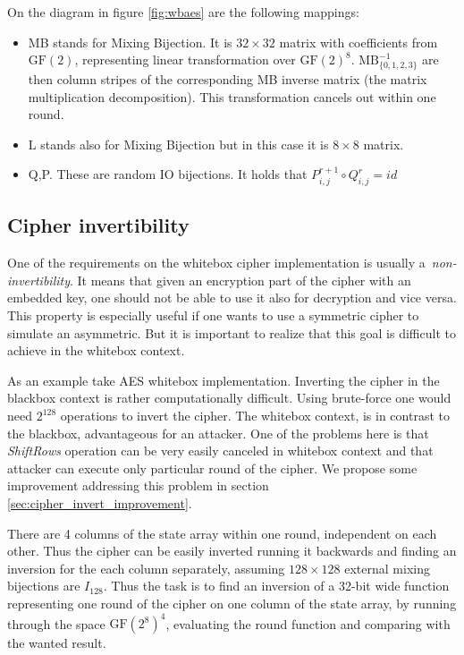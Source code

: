 \documentclass[11pt,oneside,final]{fithesis2}
\newcommand{\gf}{\ensuremath{\text{GF}\left(2\right)}}
\begin{document}
    On the diagram in figure \ref{fig:wbaes} are the following mappings:
    \begin{itemize}
    \item MB stands for Mixing Bijection. It is $32 \times 32$ matrix with coefficients from $\text{GF}(2)$, representing linear transformation over $\gf^8$. 
    $\text{MB}^{-1}_{\{0,1,2,3\}}$ are then column stripes of the corresponding MB inverse matrix (the matrix multiplication decomposition).
    This transformation cancels out within one round. 
    \item L stands also for Mixing Bijection but in this case it is $8 \times 8$ matrix.
    \item Q,P. These are random IO bijections. It holds that $P^{r+1}_{i,j} \circ Q^{r}_{i,j} = id$
    \end{itemize}

    \subsection{Cipher invertibility}\label{sec:cipher_invertibility}
    One of the requirements on the whitebox cipher implementation is usually a~\emph{non-invertibility}. It means that given an encryption part of the cipher 
    with an embedded key, one should not be able to use it also for decryption and vice versa. This property is especially useful if one wants to use a symmetric
    cipher to simulate an asymmetric. But it is important to realize that this goal is difficult to achieve in the whitebox context.
    
    As an example take AES whitebox implementation.
    Inverting the cipher in the blackbox context is rather computationally difficult. Using brute-force one would
    need $2^{128}$ operations to invert the cipher. The whitebox context, is in contrast to the blackbox, advantageous for an attacker. One of the problems here is 
    that \emph{ShiftRows} operation can be very easily canceled in whitebox context and that attacker can execute only particular round of the cipher. 
    We propose some improvement addressing this problem in section \ref{sec:cipher_invert_improvement}.

    There are 4 columns of the state array within one round, independent on each other.
    Thus the cipher can be easily inverted running it backwards and finding an inversion for the each column separately, assuming $128\times128$ external mixing bijections
    are $I_{128}$. Thus the task is to find an
    inversion of a 32-bit wide function representing one round of the cipher on one column of the state array, by running through the space $\text{GF}\left(2^8\right)^4$,
    evaluating the round function and comparing with the wanted result.
    
\end{document}
